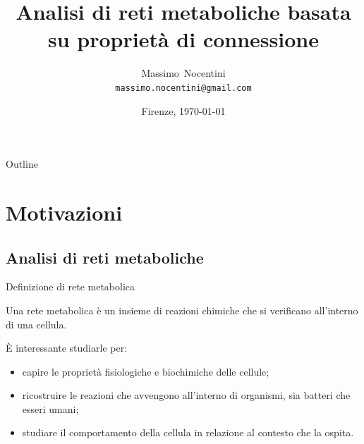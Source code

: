 \documentclass{beamer}
\title[Analisi di reti
metaboliche] %
{Analisi di reti metaboliche basata su propriet\`a di connessione}
\author[Massimo Nocentini] %
{Massimo~Nocentini\\\texttt{massimo.nocentini@gmail.com}}
\institute[UniversitaStudiFirenze] %
 { Universit\`a degli Studi di Firenze }
\date[Tesi20120222] %
{Firenze, \today}
\begin{document}
\begin{frame}[plain]
  \titlepage
\end{frame}

\begin{frame}{Outline}
  \tableofcontents[pausesections]
\end{frame}





\section{Motivazioni}

\subsection{Analisi di reti metaboliche}

\begin{frame}{Definizione di rete metabolica}
  \begin{definition}
    Una rete metabolica \`e un insieme di reazioni chimiche che si
    verificano all'interno di una cellula.
  \end{definition}
  \`E interessante studiarle per:
  \begin{itemize}
  \item capire le propriet\`a fisiologiche e biochimiche delle
    cellule;
  \item ricostruire le reazioni che avvengono all'interno di
    organismi, sia batteri che esseri umani;
  \item studiare il comportamento della cellula in relazione al
    contesto che la ospita.
  \end{itemize}
\end{frame}
\end{document}
